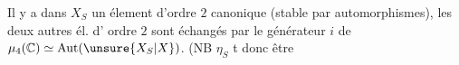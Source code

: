 Il y a dans $X_S$ un élement\raisebox{-.6em}{\unsure{:}} d'ordre $2$ canonique
(stable par automorphismes), les deux autres él. d'
ordre $2$ sont échangés par le générateur $i$ de
$\mu_4(\mathbb C)\simeq\operatorname{Aut}(\unsure{X_S|X})$.
(\leavevmode\hbox{\rlap{\kern.30em\underline{\kern-.30em\phantom{NB}}}NB} $\eta_S$ t donc être 

